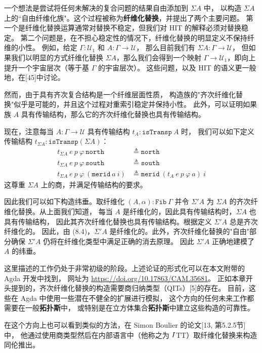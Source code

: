 \documentclass{ctexrep}
\let\mathbb\relax %
\theoremstyle{plain}
\theoremstyle{definition}
\theoremstyle{remark}
\begin{document}
一个想法是尝试将任何未解决的复合问题的结果自由添加到 $\Sigma A$ 中，
以构造 $\Sigma A$ 上的``自由纤维化族"。这个过程被称为\textbf{纤维化替换}，并提出了两个主要问题。
第一个是纤维化替换运算通常对替换不稳定，但我们对 HIT 的解释必须对替换稳定。
第二个问题是，在不担心稳定性的情况下，纤维化替换的明显定义不保持纤维的小性。
例如，给定 $\Gamma : \mathcal{U}_1$ 和 $A : \Gamma \to \mathcal{U}$，
那么目前我们有 $\Sigma A : \Gamma \to \mathcal{U}$，
但如果我们以明显的方式纤维化替换 $\Sigma A$，那么我们会得到一个映射 
$\Gamma \to \mathcal{U}_1$，即向上提升一个宇宙层次（等于基 $\Gamma$ 的宇宙层次）。
这些问题，以及 HIT 的语义更一般地，在[45]中讨论。

然而，由于具有齐次复合结构是一个纤维层面性质，
构造族的"齐次纤维化替换"似乎是可能的，并且这个过程对重索引稳定并保持小性。
此外，可以证明如果族 $A$ 具有传输结构，那么它的齐次纤维化替换也具有传输结构。

现在，注意每当 $A : \Gamma \to \mathcal{U}$ 具有传输结构 $t_A : \mathtt{isTransp}\ A$ 时，
我们可以如下定义传输结构 $t_{\Sigma A} : \mathtt{isTransp}(\Sigma A)$：
\[
\begin{aligned}
t_{\Sigma A}\ e\ p\ \varphi\ \mathtt{north} &\triangleq \mathtt{north} \\
t_{\Sigma A}\ e\ p\ \varphi\ \mathtt{south} &\triangleq \mathtt{south} \\
t_{\Sigma A}\ e\ p\ \varphi\ (\mathtt{merid}\ a\ i) &\triangleq \mathtt{merid}\ (t_A\ e\ p\ \varphi\ a)\ i
\end{aligned}
\]
这尊重 $\Sigma A$ 上的商，并满足传输结构的要求。

因此我们可以如下构造纬垂。取纤维化 $(A, \alpha) : \mathtt{Fib}\ \Gamma$ 并令 
$\Sigma' A$ 为 $\Sigma A$ 的齐次纤维化替换。从上面我们知道，
每当 $A$ 是纤维化的，因此具有传输结构时，$\Sigma A$ 也具有传输结构，
因此其齐次纤维化替换也具有传输结构。根据定义 $\Sigma' A$ 总是齐次纤维化的。
因此，由 (8.4)，$\Sigma' A$ 是纤维化的。此外，齐次纤维化替换的"自由"部分确保 
$\Sigma' A$ 仍将在纤维化类型中满足正确的消去原理。
因此 $\Sigma' A$ 正确地建模了 $A$ 的纬垂。

这里描述的工作仍处于非常初级的阶段。上述论证的形式化可以在本文附带的 Agda 开发中找到，
网址为 \url{https://doi.org/10.17863/CAM.35681}。
正如本章开头提到的，齐次纤维化替换的构造需要商归纳类型（QITs）[5]的存在。
目前，这些在 Agda 中使用一些潜在不健全的扩展进行模拟，
这个方向的任何未来工作都需要在一般\textbf{拓扑斯}中，
或特别是在立方体集合\textbf{拓扑斯}中建立这些构造的可靠性。

在这个方向上也可以看到类似的方法，在 Simon Boulier 的论文[13, 第5.2.5节]中，
他通过使用商类型然后在内部语言中（他称之为 $\mathbb{I}$TT）取纤维化替换来构造同伦推出。
\end{document}
